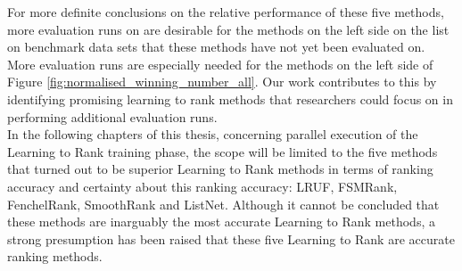 For more definite conclusions on the relative performance of these five methods, more evaluation runs on are desirable for the methods on the left side on the list on benchmark data sets that these methods have not yet been evaluated on. More evaluation runs are especially needed for the methods on the left side of Figure \ref{fig:normalised_winning_number_all}. Our work contributes to this by identifying promising learning to rank methods that researchers could focus on in performing additional evaluation runs.\\

In the following chapters of this thesis, concerning parallel execution of the Learning to Rank training phase, the scope will be limited to the five methods that turned out to be superior Learning to Rank methods in terms of ranking accuracy and certainty about this ranking accuracy: LRUF, FSMRank, FenchelRank, SmoothRank and ListNet. Although it cannot be concluded that these methods are inarguably the most accurate Learning to Rank methods, a strong presumption has been raised that these five Learning to Rank are accurate ranking methods.\\